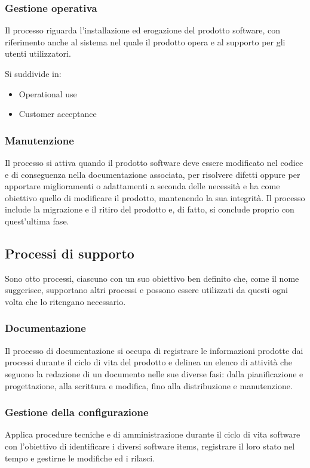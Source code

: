 \subsubsection{Gestione operativa}
Il processo riguarda l'installazione ed erogazione del prodotto software, con riferimento anche al sistema nel quale il prodotto opera e al supporto per gli utenti utilizzatori.
\par Si suddivide in:
\begin{itemize}
    \item Operational use
    \item Customer acceptance
\end{itemize}
\subsubsection{Manutenzione}
Il processo si attiva quando il prodotto software deve essere modificato nel codice e di conseguenza nella documentazione associata, per risolvere difetti oppure per apportare miglioramenti o adattamenti a seconda delle necessità e ha come obiettivo quello di modificare il prodotto, mantenendo la sua integrità. Il processo include la migrazione e il ritiro del prodotto e, di fatto, si conclude proprio con quest'ultima fase.

\subsection{Processi di supporto}
Sono otto processi, ciascuno con un suo obiettivo ben definito che, come il nome suggerisce, supportano altri processi e possono essere utilizzati da questi ogni volta che lo ritengano necessario.

\subsubsection{Documentazione}
Il processo di documentazione si occupa di registrare le informazioni prodotte dai processi durante il ciclo di vita del prodotto e delinea un elenco di attività che seguono la redazione di un documento nelle sue diverse fasi: dalla pianificazione e progettazione, alla scrittura e modifica, fino alla distribuzione e manutenzione.
\subsubsection{Gestione della configurazione}
Applica procedure tecniche e di amministrazione durante il ciclo di vita software con l'obiettivo di identificare i diversi software items, registrare il loro stato nel tempo e gestirne le modifiche ed i rilasci.
